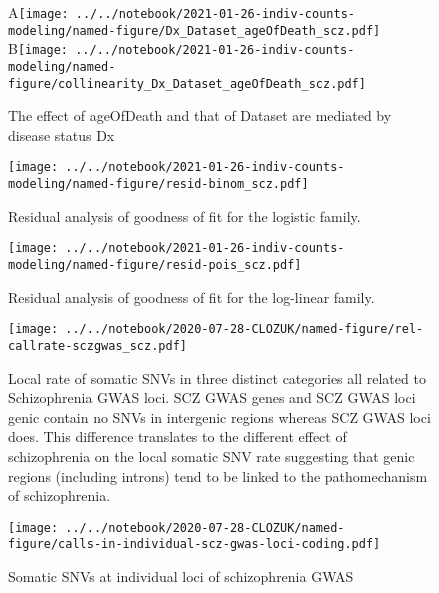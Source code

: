 \documentclass[letterpaper]{article}
\begin{document}
\begin{figure}[p]
\begin{center}
A\texttt{[image: ../../notebook/2021-01-26-indiv-counts-modeling/named-figure/Dx\_Dataset\_ageOfDeath\_scz.pdf]}
B\texttt{[image: ../../notebook/2021-01-26-indiv-counts-modeling/named-figure/collinearity\_Dx\_Dataset\_ageOfDeath\_scz.pdf]}
\end{center}
\caption{
The effect of ageOfDeath and that of Dataset are mediated by disease status Dx
}
\label{fig:d-separation}
\end{figure}

\begin{figure}[p]
\texttt{[image: ../../notebook/2021-01-26-indiv-counts-modeling/named-figure/resid-binom\_scz.pdf]}
\caption{
Residual analysis of goodness of fit for the logistic family.
}
\label{fig:binomial-QQ}
\end{figure}

\begin{figure}[p]
\texttt{[image: ../../notebook/2021-01-26-indiv-counts-modeling/named-figure/resid-pois\_scz.pdf]}
\caption{
Residual analysis of goodness of fit for the log-linear family.
}
\label{fig:poisson-QQ}
\end{figure}

\begin{figure}[p]
\texttt{[image: ../../notebook/2020-07-28-CLOZUK/named-figure/rel-callrate-sczgwas\_scz.pdf]}
\caption{
Local rate of somatic SNVs in three distinct categories all related to
Schizophrenia GWAS loci.  SCZ GWAS genes and SCZ GWAS loci genic contain no
SNVs in intergenic regions whereas SCZ GWAS loci does.  This difference
translates to the different effect of schizophrenia on the local somatic SNV
rate suggesting that genic regions (including introns) tend to be linked to
the pathomechanism of schizophrenia.
}
\label{fig:scz-gwas-genes-vs-loci}
\end{figure}

\begin{figure}[p]
\texttt{[image: ../../notebook/2020-07-28-CLOZUK/named-figure/calls-in-individual-scz-gwas-loci-coding.pdf]}
\caption{
Somatic SNVs at individual loci of schizophrenia GWAS
}
\label{fig:indiv-scz-gwas-loci}
\end{figure}
\end{document}
